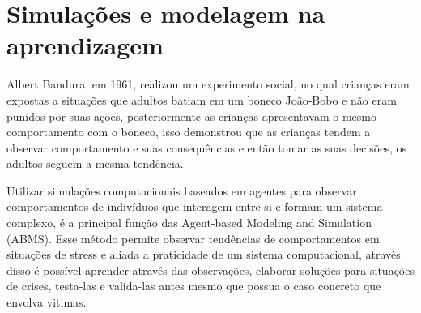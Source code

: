 \section{Simulações e modelagem na aprendizagem}

Albert Bandura, em 1961, realizou um experimento social, no qual crianças eram expostas a situações que adultos batiam em um boneco João-Bobo e não eram punidos por suas ações, posteriormente as crianças apresentavam o mesmo comportamento com o boneco, isso demonstrou que as crianças tendem a observar comportamento e suas consequências e então tomar as suas decisões, os adultos seguem a mesma tendência.

Utilizar simulações computacionais baseados em agentes para observar comportamentos de indivíduos que interagem entre si e formam um sistema complexo, é a principal função das Agent-based Modeling and Simulation (ABMS). Esse método permite observar tendências de comportamentos em situações de stress e aliada a praticidade de um sistema computacional, através disso é possível aprender através das observações, elaborar soluções para situações de crises, testa-las e valida-las antes mesmo que possua o caso concreto que envolva vitimas. 

\cite{bonabeau2002agent}

